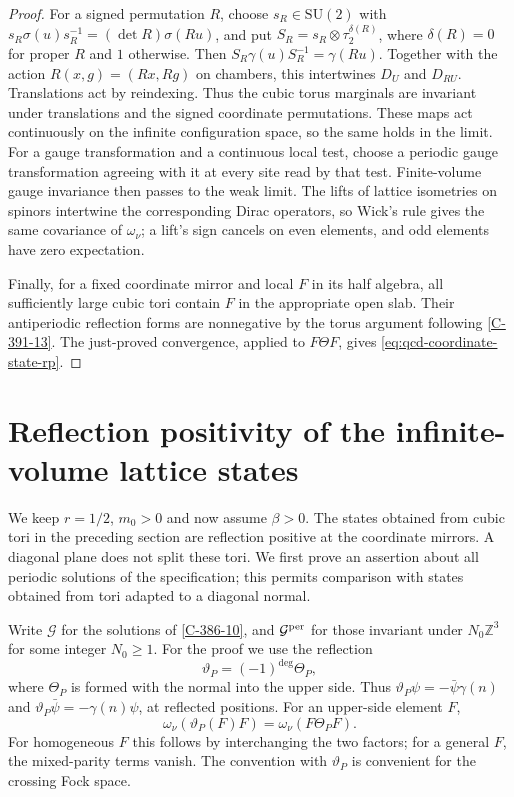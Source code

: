 \documentclass[11pt,letterpaper,reqno]{amsart}
\theoremstyle{definition}
\theoremstyle{remark}
\begin{document}
\begin{proof}
For a signed permutation $R$, choose $s_R\in\mathrm{SU}(2)$
with $s_R\sigma(u)s_R^{-1}=(\det R)\sigma(Ru)$, and put
$S_R=s_R\otimes\tau_2^{\delta(R)}$, where $\delta(R)=0$ for
proper $R$ and $1$ otherwise. Then
$S_R\gamma(u)S_R^{-1}=\gamma(Ru)$. Together with the action
$R(x,g)=(Rx,Rg)$ on chambers, this intertwines $D_U$ and
$D_{RU}$. Translations act by reindexing. Thus the cubic torus
marginals are invariant under translations and the signed coordinate
permutations. These maps act continuously on the infinite
configuration space, so the same holds in the limit.
For a gauge transformation and a continuous local test, choose
a periodic gauge transformation agreeing with it at every site
read by that test. Finite-volume gauge invariance then passes
to the weak limit. The lifts of lattice isometries on spinors
intertwine the corresponding Dirac operators, so Wick's rule
gives the same covariance of $\omega_\nu$; a lift's sign cancels
on even elements, and odd elements have zero expectation.

Finally, for a fixed coordinate mirror and local $F$ in its half
algebra, all sufficiently large cubic tori contain $F$ in the
appropriate open slab. Their antiperiodic reflection forms are
nonnegative by the torus argument following \cref{C-391-13}.
The just-proved convergence, applied to $F\Theta F$, gives
\eqref{eq:qcd-coordinate-state-rp}.
\end{proof}



\section{Reflection positivity of the infinite-volume lattice states}
\label{sec:qcd-diagonal-positivity}

We keep $r=1/2$, $m_0>0$ and now assume $\beta>0$.
The states obtained from cubic tori in the preceding section are
reflection positive at the coordinate mirrors. A diagonal plane does
not split these tori. We first prove an assertion about all periodic
solutions of the specification; this permits comparison with states
obtained from tori adapted to a diagonal normal.

Write $\mathcal G$ for the solutions of \eqref{C-386-10}, and
$\mathcal G^{\rm per}$ for those invariant under $N_0\mathbb Z^3$
for some integer $N_0\ge1$. For the proof we use the reflection
\[
 \vartheta_P=(-1)^{\deg}\Theta_P,
\]
where $\Theta_P$ is formed with the normal into the upper side.
Thus $\vartheta_P\psi=-\bar\psi\gamma(n)$ and
$\vartheta_P\bar\psi=-\gamma(n)\psi$, at reflected positions.
For an upper-side element $F$,
\begin{equation}\label{eq:qcd-reflection-order-dictionary}
 \omega_\nu(\vartheta_P(F)F)=\omega_\nu(F\Theta_PF).
\end{equation}
For homogeneous $F$ this follows by interchanging the two factors;
for a general $F$, the mixed-parity terms vanish. The convention
with $\vartheta_P$ is convenient for the crossing Fock space.
\end{document}
